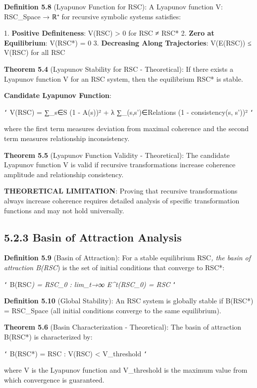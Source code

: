 \textbf{Definition 5.8} (Lyapunov Function for RSC): A Lyapunov function V: RSC_Space → ℝ⁺ for recursive symbolic systems satisfies:

1. \textbf{Positive Definiteness}: V(RSC) > 0 for RSC ≠ RSC*
2. \textbf{Zero at Equilibrium}: V(RSC*) = 0
3. \textbf{Decreasing Along Trajectories}: V(E(RSC)) ≤ V(RSC) for all RSC

\textbf{Theorem 5.4} (Lyapunov Stability for RSC - Theoretical): If there exists a Lyapunov function V for an RSC system, then the equilibrium RSC* is stable.

\textbf{Candidate Lyapunov Function}:

\texttt{`}
V(RSC) = ∑_{s∈S} (1 - A(s))² + λ ∑_{(s,s')∈Relations} (1 - consistency(s, s'))²
\texttt{`}

where the first term measures deviation from maximal coherence and the second term measures relationship inconsistency.

\textbf{Theorem 5.5} (Lyapunov Function Validity - Theoretical): The candidate Lyapunov function V is valid if recursive transformations increase coherence amplitude and relationship consistency.

\textbf{THEORETICAL LIMITATION}: Proving that recursive transformations always increase coherence requires detailed analysis of specific transformation functions and may not hold universally.

\subsection{5.2.3 Basin of Attraction Analysis}

\textbf{Definition 5.9} (Basin of Attraction): For a stable equilibrium RSC\textit{, the basin of attraction B(RSC}) is the set of initial conditions that converge to RSC*:

\texttt{`}
B(RSC\textit{) = {RSC_0 : lim_{t→∞} E^t(RSC_0) = RSC}}
\texttt{`}

\textbf{Definition 5.10} (Global Stability): An RSC system is globally stable if B(RSC*) = RSC_Space (all initial conditions converge to the same equilibrium).

\textbf{Theorem 5.6} (Basin Characterization - Theoretical): The basin of attraction B(RSC*) is characterized by:

\texttt{`}
B(RSC*) = {RSC : V(RSC) < V_threshold}
\texttt{`}

where V is the Lyapunov function and V_threshold is the maximum value from which convergence is guaranteed.

